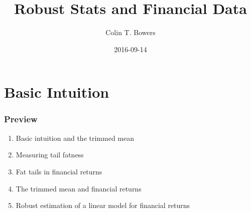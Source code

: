 \documentclass{beamer}
\title[{\makebox[.45\paperwidth]{\hfill \insertframenumber/\inserttotalframenumber}}]{Robust Stats and Financial Data}
\author{Colin T. Bowers}
\institute{Macquarie University, colintbowers@gmail.com}
\date{2016-09-14}
\begin{document}
		

\begin{frame}	

\maketitle

\end{frame}



%





	
\section{Basic Intuition}

\begin{frame}
\frametitle{Preview}
\begin{enumerate}
\item Basic intuition and the trimmed mean
\item Measuring tail fatness
\item Fat tails in financial returns
\item The trimmed mean and financial returns
\item Robust estimation of a linear model for financial returns
\end{enumerate}
\end{frame}
\end{document}
